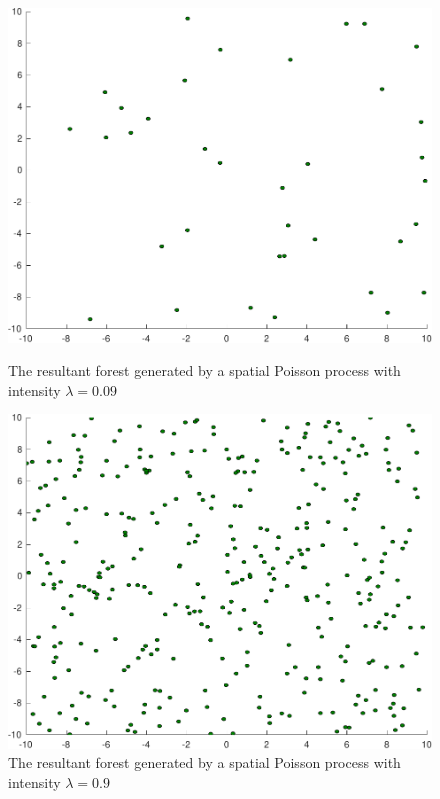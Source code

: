 \begin{figure}
  \centering
  \begin{minipage}[b]{0.4\textwidth}
    \includegraphics[width=\textwidth]{figures/experiments/poisson009}
    \caption{The resultant forest generated by a spatial Poisson process with
      intensity \(\lambda = 0.09\)}
    \label{fig:poisson009}
  \end{minipage}
  \begin{minipage}[b]{0.4\textwidth}
    \includegraphics[width=\textwidth]{figures/experiments/poisson09}
    \caption{The resultant forest generated by a spatial Poisson process with
      intensity \(\lambda = 0.9\)}
    \label{fig:poisson09}
  \end{minipage}
\end{figure}


